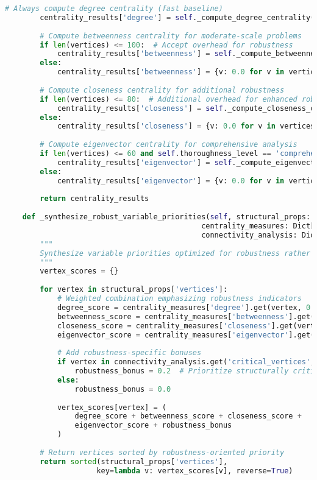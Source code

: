 \begin{lstlisting}[language=Python, caption=Robustness-Oriented Graph Analysis Pipeline]
        # Always compute degree centrality (fast baseline)
        centrality_results['degree'] = self._compute_degree_centrality(vertices, edges)
        
        # Compute betweenness centrality for moderate-scale problems
        if len(vertices) <= 100:  # Accept overhead for robustness
            centrality_results['betweenness'] = self._compute_betweenness_centrality(vertices, edges)
        else:
            centrality_results['betweenness'] = {v: 0.0 for v in vertices}
        
        # Compute closeness centrality for additional robustness
        if len(vertices) <= 80:  # Additional overhead for enhanced robustness
            centrality_results['closeness'] = self._compute_closeness_centrality(vertices, edges)
        else:
            centrality_results['closeness'] = {v: 0.0 for v in vertices}
        
        # Compute eigenvector centrality for comprehensive analysis
        if len(vertices) <= 60 and self.thoroughness_level == 'comprehensive':
            centrality_results['eigenvector'] = self._compute_eigenvector_centrality(vertices, edges)
        else:
            centrality_results['eigenvector'] = {v: 0.0 for v in vertices}
        
        return centrality_results
    
    def _synthesize_robust_variable_priorities(self, structural_props: Dict, 
                                             centrality_measures: Dict[str, Dict[int, float]], 
                                             connectivity_analysis: Dict) -> List[int]:
        """
        Synthesize variable priorities optimized for robustness rather than speed.
        """
        vertex_scores = {}
        
        for vertex in structural_props['vertices']:
            # Weighted combination emphasizing robustness indicators
            degree_score = centrality_measures['degree'].get(vertex, 0.0) * 0.4
            betweenness_score = centrality_measures['betweenness'].get(vertex, 0.0) * 0.3
            closeness_score = centrality_measures['closeness'].get(vertex, 0.0) * 0.2
            eigenvector_score = centrality_measures['eigenvector'].get(vertex, 0.0) * 0.1
            
            # Add robustness-specific bonuses
            if vertex in connectivity_analysis.get('critical_vertices', []):
                robustness_bonus = 0.2  # Prioritize structurally critical vertices
            else:
                robustness_bonus = 0.0
            
            vertex_scores[vertex] = (
                degree_score + betweenness_score + closeness_score + 
                eigenvector_score + robustness_bonus
            )
        
        # Return vertices sorted by robustness-oriented priority
        return sorted(structural_props['vertices'], 
                     key=lambda v: vertex_scores[v], reverse=True)
\end{lstlisting}


